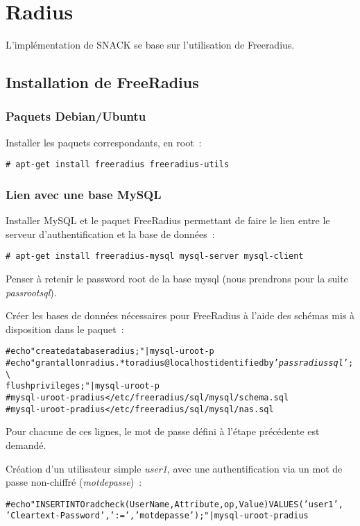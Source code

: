 \section{Radius}
L'implémentation de SNACK se base sur l'utilisation de Freeradius.
\subsection{Installation de FreeRadius}
\subsubsection{Paquets Debian/Ubuntu}

Installer les paquets correspondants, en root~:
\begin{verbatim}
# apt-get install freeradius freeradius-utils
\end{verbatim}

\subsubsection{Lien avec une base MySQL}

Installer MySQL et le paquet FreeRadius permettant de faire le lien entre le serveur d'authentification et la base de données~:
\begin{verbatim}
# apt-get install freeradius-mysql mysql-server mysql-client
\end{verbatim}

Penser à retenir le password root de la base mysql (nous prendrons pour la suite \emph{passrootsql}).

Créer les bases de données nécessaires pour FreeRadius à l'aide des schémas mis à disposition dans le paquet~:
\begin{alltt}
# echo "create database radius;" | mysql -u root -p
# echo "grant all on radius.* to radius@localhost identified by '\emph{passradiussql}'; \textbackslash \\flush privileges;" | mysql -u root -p
# mysql -uroot -p radius < /etc/freeradius/sql/mysql/schema.sql
# mysql -uroot -p radius < /etc/freeradius/sql/mysql/nas.sql
\end{alltt}
Pour chacune de ces lignes, le mot de passe défini à l'étape précédente est demandé.

Création d'un utilisateur simple \emph{user1}, avec une authentification via un mot de passe non-chiffré (\emph{motdepasse})~:
\begin{alltt}
# echo "INSERT INTO radcheck(UserName,Attribute,op,Value) VALUES ('user1',\\'Cleartext-Password',':=','motdepasse');" | mysql -u root -p radius
\end{alltt}


